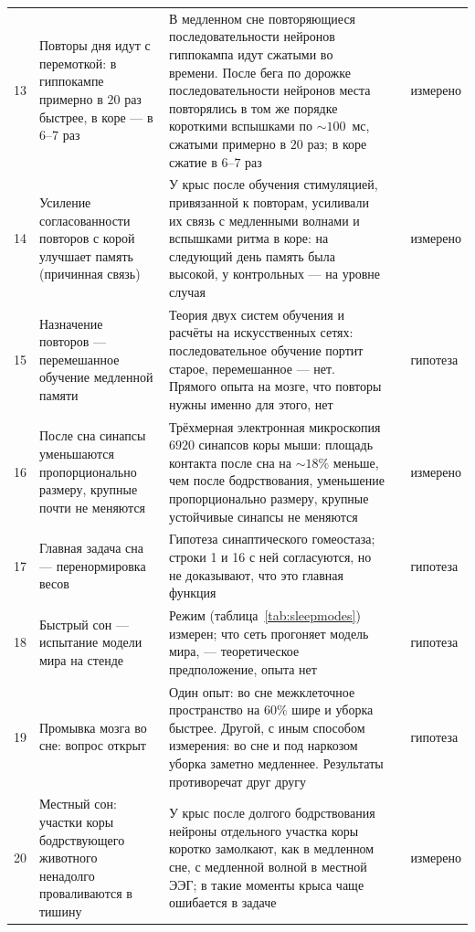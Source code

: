 {\begin{longtable}{>{\raggedright}p{0.5cm}>{\raggedright}p{4.0cm}>{\raggedright}p{5.6cm}>{\raggedright}p{2.3cm}>{\raggedright\arraybackslash}p{1.7cm}}
13 & Повторы дня идут с перемоткой: в гиппокампе примерно в $20$ раз быстрее, в коре --- в $6$--$7$ раз & В медленном сне повторяющиеся последовательности нейронов гиппокампа идут сжатыми во времени. После бега по дорожке последовательности нейронов места повторялись в том же порядке короткими вспышками по $\sim100$~мс, сжатыми примерно в $20$ раз; в коре сжатие в $6$--$7$ раз & \cite{Nadasdy1999,LeeWilson2002,Euston2007} & измерено \\
14 & Усиление согласованности повторов с корой улучшает память (причинная связь) & У крыс после обучения стимуляцией, привязанной к повторам, усиливали их связь с медленными волнами и вспышками ритма в коре: на следующий день память была высокой, у контрольных --- на уровне случая & \cite{Maingret2016} & измерено \\
15 & Назначение повторов --- перемешанное обучение медленной памяти & Теория двух систем обучения и расчёты на искусственных сетях: последовательное обучение портит старое, перемешанное --- нет. Прямого опыта на мозге, что повторы нужны именно для этого, нет & \cite{McClelland1995} & гипотеза \\
16 & После сна синапсы уменьшаются пропорционально размеру, крупные почти не меняются & Трёхмерная электронная микроскопия $6920$ синапсов коры мыши: площадь контакта после сна на $\sim18\%$ меньше, чем после бодрствования, уменьшение пропорционально размеру, крупные устойчивые синапсы не меняются & \cite{deVivo2017} & измерено \\
17 & Главная задача сна --- перенормировка весов & Гипотеза синаптического гомеостаза; строки 1 и 16 с ней согласуются, но не доказывают, что это главная функция & \cite{TononiCirelli2014} & гипотеза \\
18 & Быстрый сон --- испытание модели мира на стенде & Режим (таблица~\ref{tab:sleepmodes}) измерен; что сеть прогоняет модель мира, --- теоретическое предположение, опыта нет & \cite{Hobson2009} & гипотеза \\
19 & Промывка мозга во сне: вопрос открыт & Один опыт: во сне межклеточное пространство на $60\%$ шире и уборка быстрее. Другой, с иным способом измерения: во сне и под наркозом уборка заметно медленнее. Результаты противоречат друг другу & \cite{Xie2013,Miao2024} & гипотеза \\
20 & Местный сон: участки коры бодрствующего животного ненадолго проваливаются в тишину & У крыс после долгого бодрствования нейроны отдельного участка коры коротко замолкают, как в медленном сне, с медленной волной в местной ЭЭГ; в такие моменты крыса чаще ошибается в задаче & \cite{Vyazovskiy2011} & измерено \\
\bottomrule
\end{longtable}}

